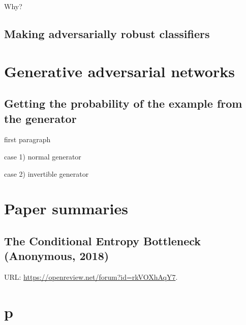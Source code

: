 \documentclass{article}
\begin{document}
Why?




\subsection{Making adversarially robust classifiers}



\section{Generative adversarial networks}

\subsection{Getting the probability of the example from the generator}

first paragraph

case 1) normal generator

case 2) invertible generator


\section{Paper summaries}

\subsection{The Conditional Entropy Bottleneck (Anonymous, 2018)}

URL: \url{https://openreview.net/forum?id=rkVOXhAqY7}.


\section{p}
\end{document}
